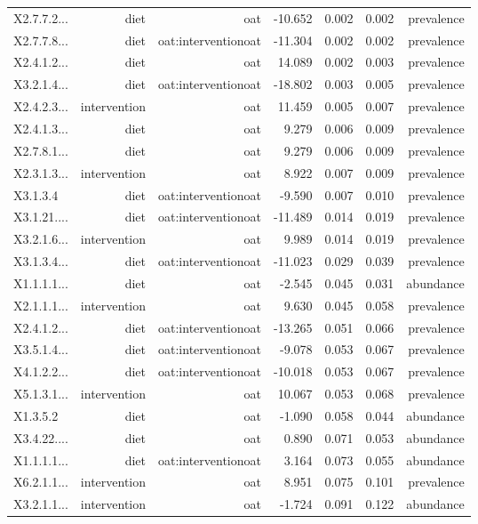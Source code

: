 \documentclass[
]{article}
\begin{document}
\begin{longtable}[t]{lrrrrrr}
\addlinespace
X2.7.7.2... & diet & oat & -10.652 & 0.002 & 0.002 & prevalence\\
X2.7.7.8... & diet & oat:interventionoat & -11.304 & 0.002 & 0.002 & prevalence\\
X2.4.1.2... & diet & oat & 14.089 & 0.002 & 0.003 & prevalence\\
X3.2.1.4... & diet & oat:interventionoat & -18.802 & 0.003 & 0.005 & prevalence\\
X2.4.2.3... & intervention & oat & 11.459 & 0.005 & 0.007 & prevalence\\
\addlinespace
X2.4.1.3... & diet & oat & 9.279 & 0.006 & 0.009 & prevalence\\
X2.7.8.1... & diet & oat & 9.279 & 0.006 & 0.009 & prevalence\\
X2.3.1.3... & intervention & oat & 8.922 & 0.007 & 0.009 & prevalence\\
X3.1.3.4 & diet & oat:interventionoat & -9.590 & 0.007 & 0.010 & prevalence\\
X3.1.21.... & diet & oat:interventionoat & -11.489 & 0.014 & 0.019 & prevalence\\
\addlinespace
X3.2.1.6... & intervention & oat & 9.989 & 0.014 & 0.019 & prevalence\\
X3.1.3.4... & diet & oat:interventionoat & -11.023 & 0.029 & 0.039 & prevalence\\
X1.1.1.1... & diet & oat & -2.545 & 0.045 & 0.031 & abundance\\
X2.1.1.1... & intervention & oat & 9.630 & 0.045 & 0.058 & prevalence\\
X2.4.1.2... & diet & oat:interventionoat & -13.265 & 0.051 & 0.066 & prevalence\\
\addlinespace
X3.5.1.4... & diet & oat:interventionoat & -9.078 & 0.053 & 0.067 & prevalence\\
X4.1.2.2... & diet & oat:interventionoat & -10.018 & 0.053 & 0.067 & prevalence\\
X5.1.3.1... & intervention & oat & 10.067 & 0.053 & 0.068 & prevalence\\
X1.3.5.2 & diet & oat & -1.090 & 0.058 & 0.044 & abundance\\
X3.4.22.... & diet & oat & 0.890 & 0.071 & 0.053 & abundance\\
\addlinespace
X1.1.1.1... & diet & oat:interventionoat & 3.164 & 0.073 & 0.055 & abundance\\
X6.2.1.1... & intervention & oat & 8.951 & 0.075 & 0.101 & prevalence\\
X3.2.1.1... & intervention & oat & -1.724 & 0.091 & 0.122 & abundance\\

\end{longtable}
\end{document}
